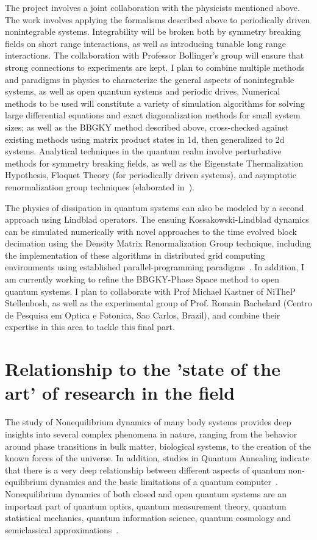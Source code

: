 \documentclass[a4paper,11pt,color]{article}
\begin{document}
The project involves a joint collaboration with the physicists mentioned above. The work involves applying the formalisms described above to periodically driven nonintegrable systems. Integrability will be broken both by symmetry breaking fields on short range interactions, as well as introducing tunable long range interactions. The collaboration with Professor Bollinger's group will ensure that strong connections to experiments are kept. I plan to combine  multiple methods and paradigms in physics to characterize the general aspects of nonintegrable systems, as well as open quantum systems and periodic drives. Numerical methods to be used will constitute a variety of simulation algorithms for solving  large differential equations and exact diagonalization methods for small system sizes; as well as the BBGKY method described above, cross-checked against existing methods using matrix product states in 1d, then generalized to 2d systems. Analytical techniques in the quantum realm involve perturbative methods for symmetry breaking fields, as well as the Eigenstate Thermalization Hypothesis, Floquet Theory (for periodically driven systems), and asymptotic renormalization group techniques (elaborated in~\cite{freezing}).

The physics of dissipation in quantum systems can also be modeled by a second approach using Lindblad operators. The ensuing Kossakowski-Lindblad dynamics  can be simulated numerically with novel approaches to the time evolved block decimation using the Density Matrix Renormalization Group technique, including the implementation of these algorithms in distributed grid computing environments using established parallel-programming paradigms~\cite{white:pdmrg}. In addition, I am currently working to refine the BBGKY-Phase Space method to open quantum systems. I plan to collaborate with Prof Michael Kastner of NiTheP Stellenbosh, as well as the experimental group of Prof. Romain Bachelard (Centro de Pesquisa em Optica e Fotonica, Sao Carlos, Brazil), and combine their expertise in this area to tackle this final part.

\section{Relationship to the 'state of the art' of research in the field}
\label{sec:originality}
The study of Nonequilibrium dynamics of many body systems provides deep insights into several complex phenomena in nature, ranging from the behavior around phase transitions in bulk matter, biological systems,  to the creation of the known forces of the universe. In addition, studies in Quantum Annealing indicate that there is a very deep relationship between different aspects of quantum non-equilibrium dynamics and the basic limitations of a quantum computer~\cite{annealing}. Nonequilibrium dynamics of both closed and open quantum systems are an important part of quantum optics, quantum measurement theory, quantum statistical mechanics, quantum information science, quantum cosmology and semiclassical approximations~\cite{openq}. 
\end{document}
